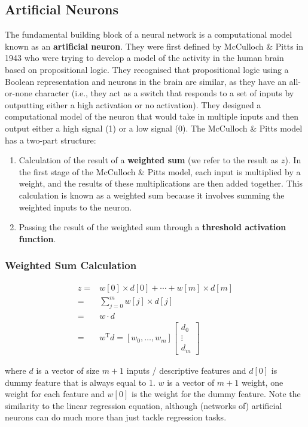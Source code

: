 \documentclass[a4paper,11pt]{article}
\begin{document}
\subsection{Artificial Neurons}
The fundamental building block of a neural network is a computational model known as an \textbf{artificial neuron}.
They were first defined by McCulloch \& Pitts in 1943 who were trying to develop a model of the activity in the human brain based on propositional logic.
They recognised that propositional logic using a Boolean representation and neurons in the brain are similar, as they have an all-or-none character (i.e., they act as a switch that responds to a set of inputs by outputting either a high activation or no activation).
They designed a computational model of the neuron that would take in multiple inputs and then output either a high signal (1) or a low signal (0).
The McCulloch \& Pitts model has a two-part structure:
\begin{enumerate}
    \item   Calculation of the result of a \textbf{weighted sum} (we refer to the result as $z$).
            In the first stage of the McCulloch \& Pitts model, each input is multiplied by a weight, and the results of these multiplications are then added together.
            This calculation is known as a weighted sum because it involves summing the weighted inputs to the neuron.
    \item   Passing the result of the weighted sum through a \textbf{threshold activation function}.
\end{enumerate}

\subsubsection{Weighted Sum Calculation}
\begin{align*}
    z   =& w[0] \times d[0] + \cdots + w[m] \times d[m] \\
    =& \sum^m_{j=0} w[j] \times d[j] \\
    =& w \cdot d \\
    =& w^{\text{T}}d = [w_0, \dots, w_m]
    \begin{bmatrix}
       d_0 \\ \vdots \\ d_m 
    \end{bmatrix}
\end{align*}

where $d$ is a vector of size $m+1$ inputs / descriptive features and $d[0]$ is dummy feature that is always equal to 1.
$w$ is a vector of $m+1$ weight, one weight for each feature and $w[0]$ is the weight for the dummy feature.
Note the similarity to the linear regression equation, although (networks of) artificial neurons can do much more than just tackle regression tasks.
\end{document}
